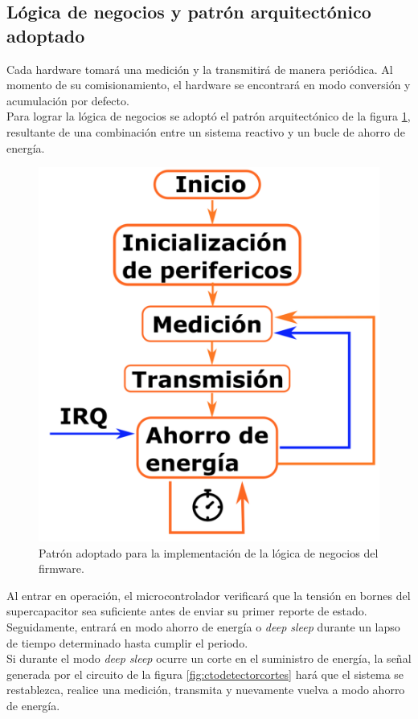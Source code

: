 \subsection{Lógica de negocios y patrón arquitectónico adoptado}
Cada hardware tomará una medición y la transmitirá de manera periódica. Al momento de su comisionamiento, el hardware se encontrará en modo conversión y acumulación por defecto.\\
Para lograr la lógica de negocios se adoptó el patrón arquitectónico de la figura \ref{fig:patronpowersaveloop}, resultante de una combinación entre un sistema reactivo y un bucle de ahorro de energía.\\
\begin{figure}[h!]
	\centering
	\includegraphics[width=0.8\linewidth]{Figures/patron_power_save_loop}
	\caption{Patrón adoptado para la implementación de la lógica de negocios del firmware.}
	\label{fig:patronpowersaveloop}
\end{figure}
Al entrar en operación, el microcontrolador verificará que la tensión en bornes del supercapacitor sea suficiente antes de enviar su primer reporte de estado. Seguidamente, entrará en modo ahorro de energía o \textit{deep sleep} durante un lapso de tiempo determinado hasta cumplir el periodo.\\
Si durante el modo \textit{deep sleep} ocurre un corte en el suministro de energía, la señal generada por el circuito de la figura \ref{fig:ctodetectorcortes} hará que el sistema se restablezca, realice una medición, transmita y nuevamente vuelva a modo ahorro de energía.\\

